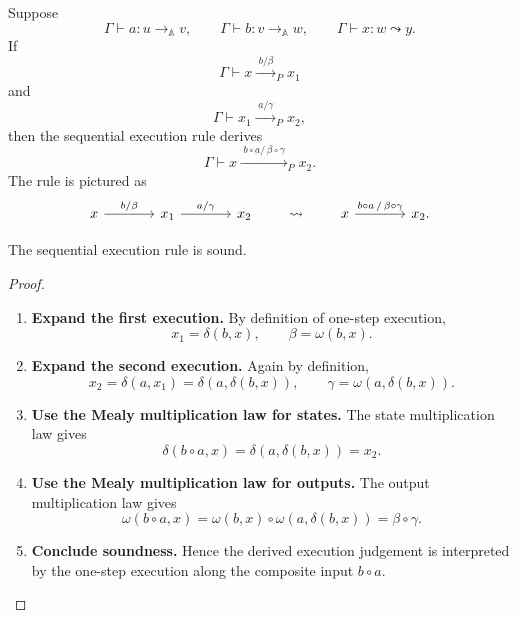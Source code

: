 \begin{definition}
\label{def:sequential-execution-rule}
    Suppose
    \[
        \Gamma\vdash a:u\to_{\mathbb A}v,
        \qquad
        \Gamma\vdash b:v\to_{\mathbb A}w,
        \qquad
        \Gamma\vdash x:w\leadsto y.
    \]
    If
    \[
        \Gamma\vdash
        x\xrightarrow{\;b/\beta\;}_{P}x_1
    \]
    and
    \[
        \Gamma\vdash
        x_1\xrightarrow{\;a/\gamma\;}_{P}x_2,
    \]
    then the sequential execution rule derives
    \[
        \Gamma\vdash
        x\xrightarrow{\;b\circ a/\,\beta\circ\gamma\;}_{P}x_2.
    \]
    The rule is pictured as
    \[
        \begin{tikzcd}[column sep=large]
            x
                \arrow[r, "{b/\beta}"]
            &
            x_1
                \arrow[r, "{a/\gamma}"]
            &
            x_2
        \end{tikzcd}
        \qquad\leadsto\qquad
        \begin{tikzcd}[column sep=large]
            x
                \arrow[r, "{b\circ a\,/\,\beta\circ\gamma}"]
            &
            x_2 .
        \end{tikzcd}
    \]
\end{definition}

\begin{proposition}
\label{prop:soundness-sequential-execution}
    The sequential execution rule is sound.
\end{proposition}

\begin{proof}
    \leavevmode
    \begin{enumerate}
        \item \textbf{Expand the first execution.}
        By definition of one-step execution,
        \[
            x_1=\delta(b,x),
            \qquad
            \beta=\omega(b,x).
        \]

        \item \textbf{Expand the second execution.}
        Again by definition,
        \[
            x_2=\delta(a,x_1)=\delta(a,\delta(b,x)),
            \qquad
            \gamma=\omega(a,\delta(b,x)).
        \]

        \item \textbf{Use the Mealy multiplication law for states.}
        The state multiplication law gives
        \[
            \delta(b\circ a,x)
            =
            \delta(a,\delta(b,x))
            =
            x_2.
        \]

        \item \textbf{Use the Mealy multiplication law for outputs.}
        The output multiplication law gives
        \[
            \omega(b\circ a,x)
            =
            \omega(b,x)\circ\omega(a,\delta(b,x))
            =
            \beta\circ\gamma.
        \]

        \item \textbf{Conclude soundness.}
        Hence the derived execution judgement is interpreted by the one-step
        execution along the composite input \(b\circ a\).
    \end{enumerate}
\end{proof}

